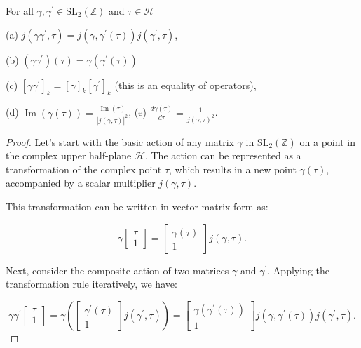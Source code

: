 \begin{proposition}
    
For all $\gamma, \gamma^{\prime} \in \mathrm{SL}_{2}(\mathbb{Z})$ and $\tau \in \mathcal{H}$

(a) $j\left(\gamma \gamma^{\prime}, \tau\right)=j\left(\gamma, \gamma^{\prime}(\tau)\right) j\left(\gamma^{\prime}, \tau\right)$,

(b) $\left(\gamma \gamma^{\prime}\right)(\tau)=\gamma\left(\gamma^{\prime}(\tau)\right)$

(c) $\left[\gamma \gamma^{\prime}\right]_{k}=[\gamma]_{k}\left[\gamma^{\prime}\right]_{k}$ (this is an equality of operators),

(d) $\operatorname{Im}(\gamma(\tau))=\frac{\operatorname{Im}(\tau)}{|j(\gamma, \tau)|^{2}}$, (e) $\frac{d \gamma(\tau)}{d \tau}=\frac{1}{j(\gamma, \tau)^{2}}$.
\begin{proof}
Let's start with the basic action of any matrix \( \gamma \) in \( \mathrm{SL}_{2}(\mathbb{Z}) \) on a point in the complex upper half-plane \( \mathcal{H} \). The action can be represented as a transformation of the complex point \( \tau \), which results in a new point \( \gamma(\tau) \), accompanied by a scalar multiplier \( j(\gamma, \tau) \).

This transformation can be written in vector-matrix form as:

\[
\gamma \begin{bmatrix}
\tau \\
1
\end{bmatrix} = \begin{bmatrix}
\gamma(\tau) \\
1
\end{bmatrix} j(\gamma, \tau).
\]

Next, consider the composite action of two matrices \( \gamma \) and \( \gamma^{\prime} \). Applying the transformation rule iteratively, we have:

\[
\gamma \gamma^{\prime} \begin{bmatrix}
\tau \\
1
\end{bmatrix} = \gamma \left( \begin{bmatrix}
\gamma^{\prime}(\tau) \\
1
\end{bmatrix} j(\gamma^{\prime}, \tau) \right) = \begin{bmatrix}
\gamma(\gamma^{\prime}(\tau)) \\
1
\end{bmatrix} j(\gamma, \gamma^{\prime}(\tau)) j(\gamma^{\prime}, \tau).
\]


\end{proof}
\end{proposition}
